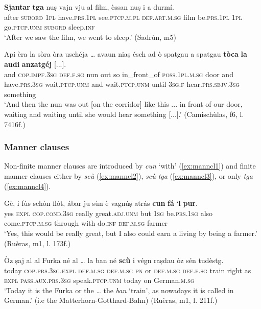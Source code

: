 \ea
\label{ex:sjantarf1}
\gll \textbf{Sjantar} \textbf{tga} nuṣ vajn vju al film, èssan nuṣ i a durmí.\\
after \textsc{subord} \textsc{1pl} have.\textsc{prs.1pl} see.\textsc{ptcp.m.pl} \textsc{def.art.m.sg} film be.\textsc{prs.1pl} \textsc{1pl} go.\textsc{ptcp.unm} \textsc{subord} sleep.\textsc{inf}\\
\glt `After we saw the film, we went to sleep.' (Sadrún, m5)
\z

\ea
\label{ex:tempcl4}
\gll    Api èra la sòra òra uschéja … avaun niaṣ ésch ad ò spatgau a spatgau \textbf{tòca} \textbf{la} \textbf{audi} \textbf{anzatgéj} [...].\\
and \textsc{cop.impf.3sg} \textsc{def.f.sg} nun out so {} in\_front\_of \textsc{poss.1pl.m.sg} door and have.\textsc{prs.3sg} wait.\textsc{ptcp.unm} and wait.\textsc{ptcp.unm} until \textsc{3sg.f} hear.\textsc{prs.sbjv.3sg} something\\
\glt `And then the nun was out [on the corridor] like this ... in front of our door, waiting and waiting until she would hear something [...].' (Camischùlas, f6, l. 7416f.)
\z


\subsubsection{Manner clauses}
Non-finite manner clauses are introduced by \textit{cun} `with' (\ref{ex:manncl1}) and finite manner clauses either by \textit{scù} (\ref{ex:manncl2}), \textit{scù tga} (\ref{ex:manncl3}), or only \textit{tga} (\ref{ex:manncl4}).

\ea
\label{ex:manncl1}
\gll   Gè, i fùs schòn flòt, ábar ju sùn è vagnúṣ atrás \textbf{cun} \textbf{fá} `\textbf{l} \textbf{pur}. \\
yes \textsc{expl} \textsc{cop.cond.3sg} really great.\textsc{adj.unm} but \textsc{1sg}  be.\textsc{prs.1sg} also  come.\textsc{ptcp.m.sg} through with  do.\textsc{inf} \textsc{def.m.sg} farmer\\
\glt `Yes, this would be really great, but I also could earn a living by being a farmer.' (Ruèras, m1, l. 173f.)
\z

\ea
\label{ex:manncl2}
\gll    Òz ṣaj al al Furka né al … la ban\footnotemark{} né \textbf{scù} i végn raṣdau òz sén tudèstg.\\
today \textsc{cop.prs.3sg.expl} \textsc{def.m.sg} \textsc{def.m.sg} \textsc{pn} or \textsc{def.m.sg} {} \textsc{def.f.sg} train right as \textsc{expl} \textsc{pass.aux.prs.3sg} speak.\textsc{ptcp.unm} today on German.\textsc{m.sg}\\
\glt `Today it is the Furka or the … the \textit{ban} `train', as nowadays it is called in German.' (i.e the Matterhorn-Gotthard-Bahn) (Ruèras, m1, l. 211f.)
\z


